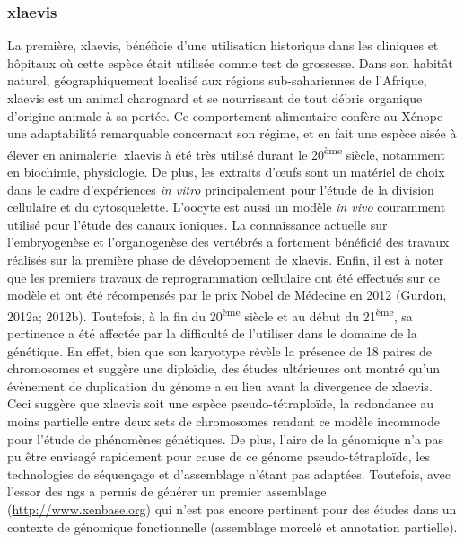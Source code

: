 \documentclass[../main.tex]{subfiles}
\begin{document}
\subsubsection{\gls{xlaevis}}
La première, \gls{xlaevis}, bénéficie d'une utilisation historique dans les cliniques et hôpitaux où cette espèce était utilisée comme test de grossesse.
Dans son habitât naturel, géographiquement localisé aux régions sub-sahariennes de l'Afrique, \gls{xlaevis} est un animal charognard et se nourrissant de tout débris organique d'origine animale à sa portée.
Ce comportement alimentaire confère au Xénope une adaptabilité remarquable concernant son régime, et en fait une espèce aisée à élever en animalerie.
\gls{xlaevis} à été très utilisé durant le 20\textsuperscript{ème} siècle, notamment en biochimie, physiologie.
De plus, les extraits d'œufs sont un matériel de choix dans le cadre d'expériences \textit{in vitro} principalement pour l'étude de la division cellulaire et du cytosquelette.
L'oocyte est aussi un modèle \textit{in vivo} couramment utilisé pour l'étude des canaux ioniques.
La connaissance actuelle sur l'embryogenèse et l'organogenèse des vertébrés a fortement bénéficié des travaux réalisés sur la première phase de développement de \gls{xlaevis}.
Enfin, il est à noter que les premiers travaux de reprogrammation cellulaire ont été effectués sur ce modèle et ont été récompensés par le prix Nobel de Médecine en 2012 (Gurdon, 2012a; 2012b).
Toutefois, à la fin du 20\textsuperscript{ème} siècle et au début du 21\textsuperscript{ème}, sa pertinence a été affectée par la difficulté de l'utiliser dans le domaine de la génétique.
En effet, bien que son karyotype révèle la présence de 18 paires de chromosomes et suggère une diploïdie, des études ultérieures ont montré qu'un évènement de duplication du génome a eu lieu avant la divergence de \gls{xlaevis}. 
Ceci suggère que \gls{xlaevis} soit une espèce pseudo-tétraploïde, la redondance au moins partielle entre deux sets de chromosomes rendant ce modèle incommode pour l'étude de phénomènes génétiques.
De plus, l'aire de la génomique n'a pas pu être envisagé rapidement pour cause de ce génome pseudo-tétraploïde, les technologies de séquençage et d'assemblage n'étant pas adaptées.
Toutefois, avec l'essor des \gls{ngs} a permis de générer un premier assemblage (\url{http://www.xenbase.org}) qui n'est pas encore pertinent pour des études dans un contexte de génomique fonctionnelle (assemblage morcelé et annotation partielle).
\end{document}
